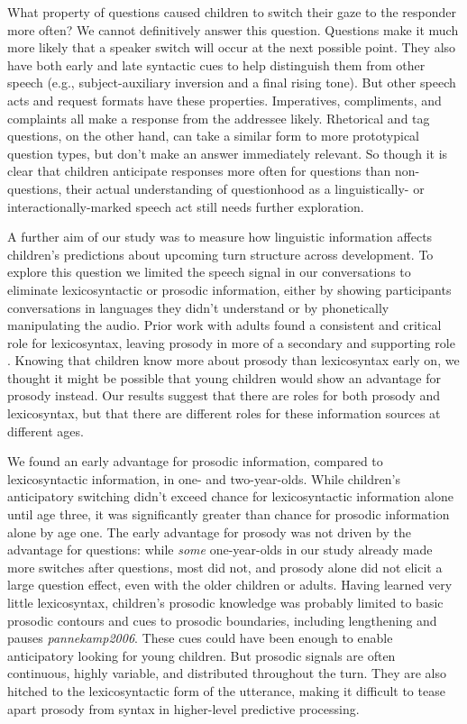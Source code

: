 \documentclass[authoryear, 12pt]{elsarticle}
\begin{document}
What property of questions caused children to switch their gaze to the responder more often? We cannot definitively answer this question. Questions make it much more likely that a speaker switch will occur at the next possible point. They also have both early and late syntactic cues to help distinguish them from other speech (e.g., subject-auxiliary inversion and a final rising tone). But other speech acts and request formats have these properties. Imperatives, compliments, and complaints all make a response from the addressee likely. Rhetorical and tag questions, on the other hand, can take a similar form to more prototypical question types, but don't make an answer immediately relevant. So though it is clear that children anticipate responses more often for questions than non-questions, their actual understanding of questionhood as a linguistically- or interactionally-marked speech act still needs further exploration.

A further aim of our study was to measure how linguistic information affects children's predictions about upcoming turn structure across development. To explore this question we limited the speech signal in our conversations to eliminate lexicosyntactic or prosodic information, either by showing participants conversations in languages they didn't understand or by phonetically manipulating the audio. Prior work with adults found a consistent and critical role for lexicosyntax, leaving prosody in more of a secondary and supporting role \citep{de-ruiter2006, magyari2012}. Knowing that children know more about prosody than lexicosyntax early on, we thought it might be possible that young children would show an advantage for prosody instead. Our results suggest that there are roles for both prosody and lexicosyntax, but that there are different roles for these information sources at different ages.

We found an early advantage for prosodic information, compared to lexicosyntactic information, in one- and two-year-olds. While children's anticipatory switching didn't exceed chance for lexicosyntactic information alone until age three, it was significantly greater than chance for prosodic information alone by age one. The early advantage for prosody was not driven by the advantage for questions: while \textit{some} one-year-olds in our study already made more switches after questions, most did not, and prosody alone did not elicit a large question effect, even with the older children or adults. Having learned very little lexicosyntax, children's prosodic knowledge was probably limited to basic prosodic contours and cues to prosodic boundaries, including lengthening and pauses \textit{pannekamp2006}. These cues could have been enough to enable anticipatory looking for young children. But prosodic signals are often continuous, highly variable, and distributed throughout the turn. They are also hitched to the lexicosyntactic form of the utterance, making it difficult to tease apart prosody from syntax in higher-level predictive processing.
\end{document}
